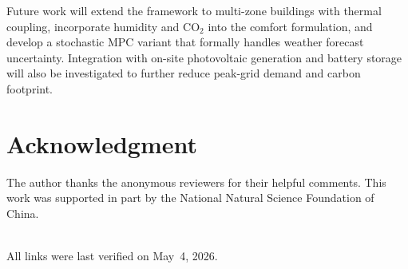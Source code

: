 \documentclass[conference,a4paper]{IEEEtran}[2015/08/26]
\begin{document}
Future work will extend the framework to multi-zone buildings with
thermal coupling, incorporate humidity and CO$_2$ into the comfort
formulation, and develop a stochastic MPC variant that formally handles
weather forecast uncertainty. Integration with on-site photovoltaic
generation and battery storage will also be investigated to further
reduce peak-grid demand and carbon footprint.

\section*{Acknowledgment}

The author thanks the anonymous reviewers for their helpful comments.
This work was supported in part by the National Natural Science
Foundation of China.


\clearpage



\ \\
\noindent All links were last verified on May~4, 2026.
\end{document}

